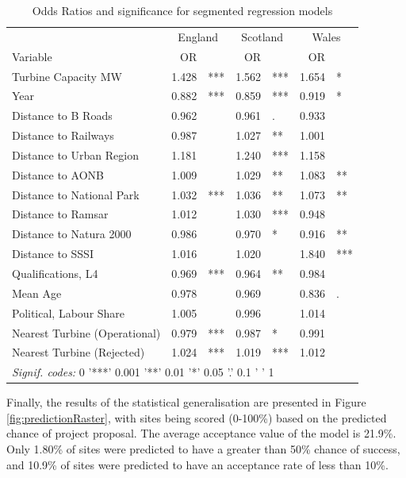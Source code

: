 \documentclass[a4paper,]{article}
\theoremstyle{definition}
\theoremstyle{definition}
\theoremstyle{definition}
\theoremstyle{remark}
\begin{document}
\begin{table}[t]

\caption{\label{tab:segmented}Odds Ratios and significance for segmented regression models}
\centering
\begin{tabular}{lrlrlrl}
\toprule
\multicolumn{1}{c}{ } & \multicolumn{2}{c}{England} & \multicolumn{2}{c}{Scotland} & \multicolumn{2}{c}{Wales} \\
\cmidrule(l{2pt}r{2pt}){2-3} \cmidrule(l{2pt}r{2pt}){4-5} \cmidrule(l{2pt}r{2pt}){6-7}
Variable & OR &  & OR &  & OR & \\
\midrule
Turbine Capacity MW & 1.428 & *** & 1.562 & *** & 1.654 & *\\
Year & 0.882 & *** & 0.859 & *** & 0.919 & *\\
Distance to B Roads & 0.962 &  & 0.961 & . & 0.933 & \\
Distance to Railways & 0.987 &  & 1.027 & ** & 1.001 & \\
Distance to  Urban Region & 1.181 &  & 1.240 & *** & 1.158 & \\
Distance to AONB & 1.009 &  & 1.029 & ** & 1.083 & **\\
Distance to National Park & 1.032 & *** & 1.036 & ** & 1.073 & **\\
Distance to Ramsar & 1.012 &  & 1.030 & *** & 0.948 & \\
Distance to Natura 2000 & 0.986 &  & 0.970 & * & 0.916 & **\\
Distance to SSSI & 1.016 &  & 1.020 &  & 1.840 & ***\\
Qualifications, L4 & 0.969 & *** & 0.964 & ** & 0.984 & \\
Mean Age & 0.978 &  & 0.969 &  & 0.836 & .\\
Political, Labour Share & 1.005 &  & 0.996 &  & 1.014 & \\
Nearest Turbine (Operational) & 0.979 & *** & 0.987 & * & 0.991 & \\
Nearest Turbine (Rejected) & 1.024 & *** & 1.019 & *** & 1.012 & \\
\bottomrule
\multicolumn{7}{l}{\textit{Signif. codes:} 0 '***' 0.001 '**' 0.01 '*' 0.05 '.' 0.1 ' ' 1}\\
\end{tabular}
\end{table}

Finally, the results of the statistical generalisation are presented in
Figure \ref{fig:predictionRaster}, with sites being scored (0-100\%)
based on the predicted chance of project proposal. The average
acceptance value of the model is 21.9\%. Only 1.80\% of sites were
predicted to have a greater than 50\% chance of success, and 10.9\% of
sites were predicted to have an acceptance rate of less than 10\%.
\end{document}
